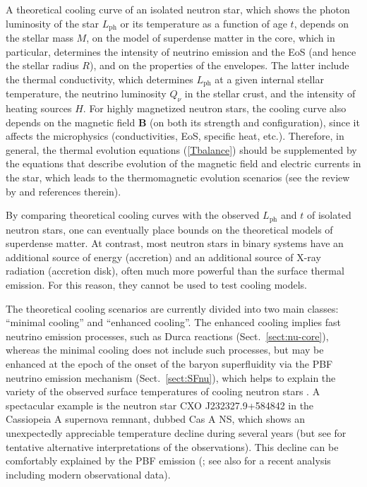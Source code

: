 \documentclass[smallextended]{svjour3}       %
\begin{document}
A theoretical cooling curve of an isolated neutron star, which shows the photon
luminosity of the star $L_\mathrm{ph}$ or its temperature as
a function of age $t$, depends on the stellar mass $M$, on
the model of superdense matter in the core, which in
particular, determines the intensity of neutrino emission
and the EoS (and hence the stellar radius $R$), and on the
properties of the envelopes. The latter include the thermal
conductivity, which determines $L_\mathrm{ph}$ at a given
internal stellar temperature, the neutrino luminosity
$Q_\nu$ in the stellar crust,  and the intensity of heating
sources $H$. For highly magnetized neutron stars, the
cooling curve also depends on  the magnetic field $\bm{B}$
(on both its strength and configuration), since it affects
the microphysics (conductivities, EoS, specific heat, etc.).
Therefore, in general, the thermal evolution equations
(\ref{Tbalance}) should be supplemented by the equations
that describe evolution of the magnetic field and electric
currents in the star, which leads to the thermomagnetic
evolution scenarios (see the review by
\citealp{Mereghetti-ea15} and references therein).

By comparing theoretical cooling curves with the observed
$L_\mathrm{ph}$ and $t$ of isolated neutron stars, one can
eventually place bounds on the theoretical models of
superdense matter. At contrast, most neutron stars in binary
systems have an additional source of energy (accretion) and
an additional source  of X-ray radiation (accretion disk),
often much more powerful than the surface thermal emission.
For this reason, they cannot be used to test cooling models.

The theoretical cooling scenarios are currently divided into
two main classes: ``minimal cooling'' and ``enhanced
cooling''. The enhanced cooling implies fast neutrino
emission processes, such as Durca reactions
(Sect.~\ref{sect:nu-core}), whereas the minimal cooling does
not include such processes, but may be enhanced at the epoch
of the onset of the baryon superfluidity via the PBF
neutrino emission mechanism (Sect.~\ref{sect:SFnu}), which
helps to explain the variety of the observed surface
temperatures of cooling neutron stars
\citep{Gusakov-ea04,Pageetal2004}. A spectacular example is
the neutron star CXO J232327.9+584842 in the Cassiopeia A
supernova remnant, dubbed Cas A NS, which shows an
unexpectedly appreciable temperature decline during several
years \citep{HeinkeHo10,Elshamouty-ea13} (but see
\citealp{Posselt-ea13} for tentative alternative
interpretations of the observations). This decline can be
comfortably explained by the PBF emission
(\citealp{Page-ea11,Shternin-ea11}; see also \citealp{Ho-ea15}
for a recent analysis including modern observational data).
\end{document}
